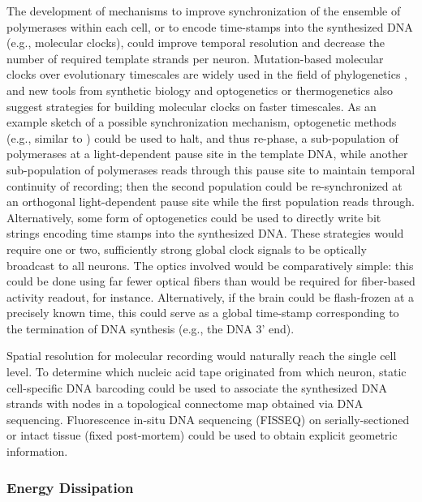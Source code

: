 The development of mechanisms to improve synchronization of the ensemble of polymerases within each cell, or to encode time-stamps into the synthesized DNA (e.g., molecular clocks), could improve temporal resolution and decrease the number of required template strands per neuron. Mutation-based molecular clocks over evolutionary timescales are widely used in the field of phylogenetics \cite{Ochman1987}, and new tools from synthetic biology \cite{Elowitz2000} and optogenetics or thermogenetics \cite{Bernstein2012} also suggest strategies for building molecular clocks on faster timescales. As an example sketch of a possible synchronization mechanism, optogenetic methods (e.g., similar to \cite{konermann2013optical}) could be used to halt, and thus re-phase, a sub-population of polymerases at a light-dependent pause site in the template DNA, while another sub-population of polymerases reads through this pause site to maintain temporal continuity of recording; then the second population could be re-synchronized at an orthogonal light-dependent pause site while the first population reads through. Alternatively, some form of optogenetics could be used to directly write bit strings encoding time stamps into the synthesized DNA.  These strategies would require one or two, sufficiently strong global clock signals to be optically broadcast to all neurons. The optics involved would be comparatively simple: this could be done using far fewer optical fibers than would be required for fiber-based activity readout, for instance. Alternatively, if the brain could be flash-frozen at a precisely known time, this could serve as a global time-stamp corresponding to the termination of DNA synthesis (e.g., the DNA 3' end).

Spatial resolution for molecular recording would naturally reach the single cell level. To determine which nucleic acid tape originated from which neuron, static cell-specific DNA barcoding could be used \cite{zador12} to associate the synthesized DNA strands with nodes in a topological connectome map obtained via DNA sequencing.  Fluorescence in-situ DNA sequencing (FISSEQ) \cite{Lee2013InSitu} on serially-sectioned or intact tissue (fixed post-mortem) \cite{chung2013structural} could be used to obtain explicit geometric information.

\subsubsection{Energy Dissipation}

